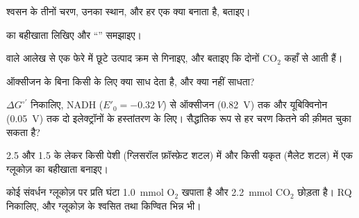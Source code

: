 \begin{exercise}[$\star$]\label{exo:b1:respiration-fermentation:1}
श्वसन के तीनों चरण, उनका स्थान, और हर एक क्या बनाता है, बताइए।
\end{exercise}

\begin{exercise}[$\star$]\label{exo:b1:respiration-fermentation:2}
 का बहीखाता लिखिए और ``'' समझाइए।
\end{exercise}

\begin{exercise}[$\star$]\label{exo:b1:respiration-fermentation:3}
 वाले आलेख से एक फेरे में छूटे उत्पाद क्रम से गिनाइए, और
बताइए कि दोनों $\mathrm{CO_2}$ कहाँ से आती हैं।
\end{exercise}

\begin{exercise}[$\star$]\label{exo:b1:respiration-fermentation:4}
ऑक्सीजन के बिना किसी  के लिए  क्या साध देता है, और क्या नहीं
साधता?
\end{exercise}

\begin{exercise}[$\star\star$]\label{exo:b1:respiration-fermentation:5}
$\Delta G^{\circ\prime}$ निकालिए, NADH ($E'_0 = \qty{-0.32}{V}$) से
ऑक्सीजन (\qty{+0.82}{V}) तक और यूबिक्विनोन (\qty{+0.05}{V}) तक दो
इलेक्ट्रॉनों के हस्तांतरण के लिए। सैद्धांतिक रूप से हर चरण कितने  की
क़ीमत चुका सकता है?
\end{exercise}

\begin{exercise}[$\star\star$]\label{exo:b1:respiration-fermentation:6}
2.5 और 1.5 के  लेकर किसी पेशी  (ग्लिसरॉल
फ़ॉस्फ़ेट शटल) में और किसी यकृत  (मैलेट शटल) में एक ग्लूकोज़ का
 बहीखाता बनाइए।
\end{exercise}

\begin{exercise}[$\star\star$]\label{exo:b1:respiration-fermentation:7}
कोई संवर्धन ग्लूकोज़ पर प्रति घंटा \qty{1.0}{mmol} $\mathrm{O_2}$ खपाता
है और \qty{2.2}{mmol} $\mathrm{CO_2}$ छोड़ता है। RQ निकालिए, और
ग्लूकोज़ के श्वसित तथा किण्वित भिन्न भी।
\end{exercise}

